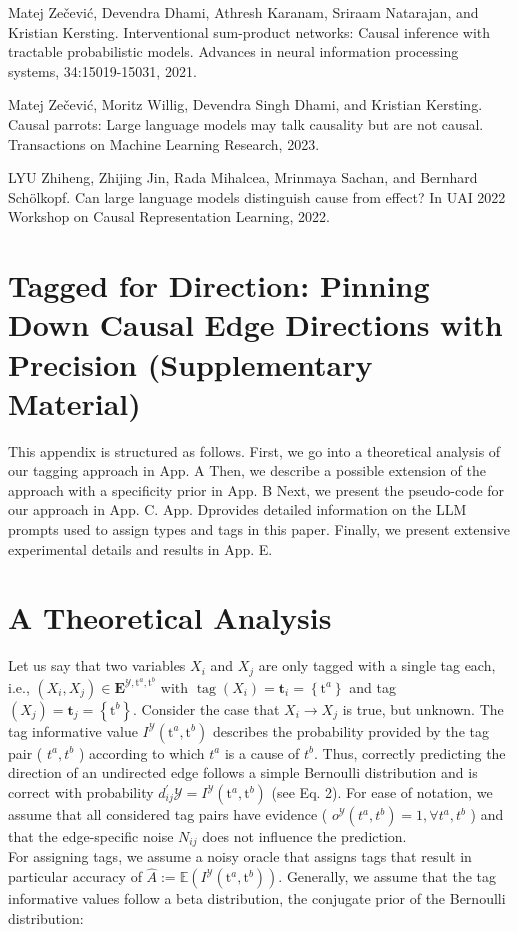 \documentclass[10pt]{article}
\begin{document}
Matej Zečević, Devendra Dhami, Athresh Karanam, Sriraam Natarajan, and Kristian Kersting. Interventional sum-product networks: Causal inference with tractable probabilistic models. Advances in neural information processing systems, 34:15019-15031, 2021.

Matej Zečević, Moritz Willig, Devendra Singh Dhami, and Kristian Kersting. Causal parrots: Large language models may talk causality but are not causal. Transactions on Machine Learning Research, 2023.

LYU Zhiheng, Zhijing Jin, Rada Mihalcea, Mrinmaya Sachan, and Bernhard Schölkopf. Can large language models distinguish cause from effect? In UAI 2022 Workshop on Causal Representation Learning, 2022.

\section*{Tagged for Direction: Pinning Down Causal Edge Directions with Precision (Supplementary Material)}
This appendix is structured as follows. First, we go into a theoretical analysis of our tagging approach in App. A Then, we describe a possible extension of the approach with a specificity prior in App. B Next, we present the pseudo-code for our approach in App. C. App. Dprovides detailed information on the LLM prompts used to assign types and tags in this paper. Finally, we present extensive experimental details and results in App. E.

\section*{A Theoretical Analysis}
Let us say that two variables $X_{i}$ and $X_{j}$ are only tagged with a single tag each, i.e., $\left(X_{i}, X_{j}\right) \in \mathbf{E}^{\mathcal{Y}, \mathrm{t}^{a}, \mathrm{t}^{b}}$ with $\operatorname{tag}\left(X_{i}\right)=\mathbf{t}_{i}=\left\{\mathrm{t}^{a}\right\}$ and tag $\left(X_{j}\right)=\mathbf{t}_{j}=\left\{\mathrm{t}^{b}\right\}$. Consider the case that $X_{i} \rightarrow X_{j}$ is true, but unknown. The tag informative value $I^{\mathcal{Y}}\left(\mathrm{t}^{a}, \mathrm{t}^{b}\right)$ describes the probability provided by the tag pair ( $t^{a}, t^{b}$ ) according to which $t^{a}$ is a cause of $t^{b}$. Thus, correctly predicting the direction of an undirected edge follows a simple Bernoulli distribution and is correct with probability $d_{i j}^{\prime} \mathcal{Y}=I^{\mathcal{Y}}\left(\mathrm{t}^{a}, \mathrm{t}^{b}\right)$ (see Eq. 2). For ease of notation, we assume that all considered tag pairs have evidence ( $o^{\mathcal{Y}}\left(t^{a}, t^{b}\right)=1, \forall t^{a}, t^{b}$ ) and that the edge-specific noise $N_{i j}$ does not influence the prediction.\\
For assigning tags, we assume a noisy oracle that assigns tags that result in particular accuracy of $\hat{A}:=\mathbb{E}\left(I^{\mathcal{Y}}\left(\mathrm{t}^{a}, \mathrm{t}^{b}\right)\right)$. Generally, we assume that the tag informative values follow a beta distribution, the conjugate prior of the Bernoulli distribution:
\end{document}
